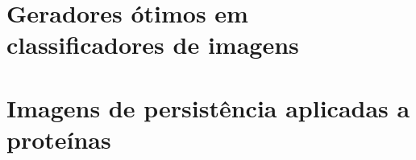 \section{Geradores ótimos em classificadores de imagens}

\section{Imagens de persistência aplicadas a proteínas}
